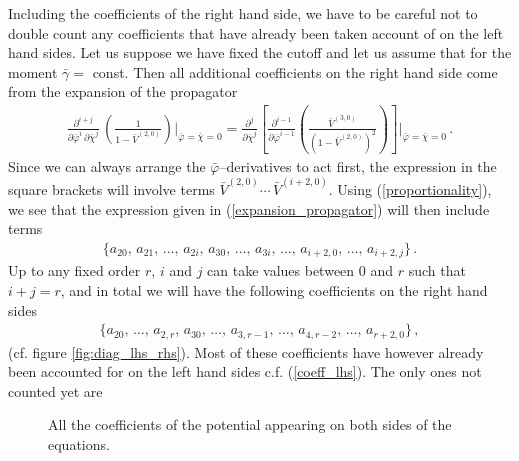 \documentclass[11pt]{book} %
\numberwithin{equation}{chapter}
\begin{document}
Including the coefficients of the right hand side,
we have to be careful not to double count any coefficients that have already been taken account of on the
left hand sides. Let us suppose we have fixed the cutoff and let us assume that for the
moment $\bar{\gamma} =$ const. Then all additional coefficients on the right hand side come from the
expansion of the propagator
\begin{align}
  \label{expansion_propagator}
  \frac{\partial^{i+j}}{\partial \bar\varphi^i \, \partial \bar\chi^j} \, \left( \frac{1}{1 - \bar V^{(2,0)}} \right) \bigg|_{\bar\varphi = \bar\chi = 0} =
  \frac{\partial^{j}}{\partial \bar\chi^j} \left[ \frac{\partial^{i-1}}{\partial \bar\varphi^{i-1}} \left( \frac{\bar V^{(3,0)}}{(1 - \bar V^{(2,0)})^2} \right) \right] \Bigg|_{\bar\varphi = \bar\chi = 0}\, .
\end{align}
Since we can always arrange the $\bar\varphi$--derivatives to act first,
the expression in the square brackets will involve terms $\bar V^{(2,0)} \cdots \, \bar V^{(i+2,0)}$.
Using (\ref{proportionality}), we see that the expression given in (\ref{expansion_propagator}) will
then include terms
\begin{align}
  \bigg\lbrace
  a_{20},\, a_{21},\, \dots ,\, a_{2i},\, a_{30},\, \dots ,\, a_{3i},\, \dots,\, a_{i+2,0},\, \dots,\, a_{i+2,j}
  \bigg\rbrace \,.
\end{align}
Up to any fixed order $r$, $i$ and $j$ can take values between $0$ and $r$ such that $i+j = r$,
and in total we will have the following coefficients on the right hand sides
%     
\begin{align}
  \bigg\lbrace
  a_{20},\, \dots ,\, a_{2,r},\, a_{30},\, \dots ,\, a_{3,r-1},\, \dots ,\, a_{4,r-2},\, \dots,\, a_{r+2,0}
  \bigg\rbrace \,,
\end{align}
(cf. figure \ref{fig:diag_lhs_rhs}).
Most of these coefficients have however already been accounted for on the left hand sides
c.f. (\ref{coeff_lhs}). The only ones not counted yet are
\begin{figure}
  \begin{center}
    
  \end{center}
  \caption{
    All the coefficients of the potential appearing on both sides of the equations.
  }
  \label{fig:diag-all}
\end{figure}
\end{document}
